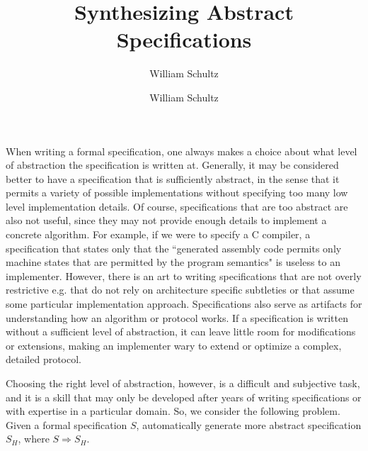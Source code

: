 \documentclass[10pt,a4paper]{article}
\author{William Schultz}
\begin{document}
\title{Synthesizing Abstract Specifications}
\author{William Schultz}
\maketitle

When writing a formal specification, one always makes a choice about what level of abstraction the specification is written at. Generally, it may be considered better to have a specification that is sufficiently abstract, in the sense that it permits a variety of possible implementations without specifying too many low level implementation details. Of course, specifications that are too abstract are also not useful, since they may not provide enough details to implement a concrete algorithm. For example, if we were to specify a C compiler, a specification that states only that the ``generated assembly code permits only machine states that are permitted by the program semantics" is useless to an implementer. However, there is an art to writing specifications that are not overly restrictive e.g. that do not rely on architecture specific subtleties or that assume some particular implementation approach. Specifications also serve as artifacts for understanding how an algorithm or protocol works. If a specification is written without a sufficient level of abstraction, it can leave little room for modifications or extensions, making an implementer wary to extend or optimize a complex, detailed protocol. 

Choosing the right level of abstraction, however, is a difficult and subjective task, and it is a skill that may only be developed after years of writing specifications or with expertise in a particular domain. So, we consider the following problem. Given a formal specification $S$, automatically generate more abstract specification $S_H$, where $S \Rightarrow S_H$. 
\end{document}
